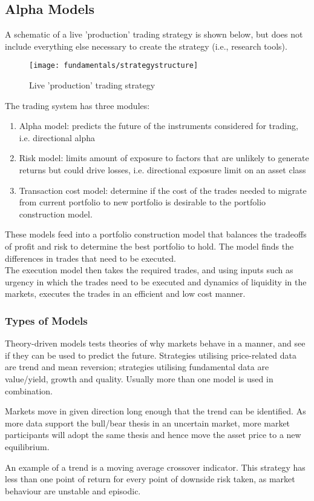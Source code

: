 \subsection{Alpha Models}

A schematic of a live 'production' trading strategy is shown below, but does not include everything else necessary to create the strategy (i.e., research tools).
\begin{figure}[H]
\centering
\texttt{[image: fundamentals/strategystructure]}
\caption{Live 'production' trading strategy}
\end{figure}
The trading system has three modules:
\begin{enumerate}[label=\roman*.]
\setlength{\itemsep}{0pt}
\item Alpha model: predicts the future of the instruments considered for trading, i.e. directional alpha
\item Risk model: limits amount of exposure to factors that are unlikely to generate returns but could drive losses, i.e. directional exposure limit on an asset class
\item Transaction cost model: determine if the cost of the trades needed to migrate from current portfolio to new portfolio is desirable to the portfolio construction model.
\end{enumerate}
These models feed into a portfolio construction model that balances the tradeoffs of profit and risk to determine the best portfolio to hold. The model finds the differences in trades that need to be executed.\\
The execution model then takes the required trades, and using inputs such as urgency in which the trades need to be executed and dynamics of liquidity in the markets, executes the trades in an efficient and low cost manner.

\subsubsection{Types of Models}

Theory-driven models tests theories of why markets behave in a manner, and see if they can be used to predict the future. Strategies utilising price-related data are trend and mean reversion; strategies utilising fundamental data are value/yield, growth and quality. Usually more than one model is used in combination.

\begin{definition}
 Markets move in given direction long enough that the trend can be identified. As more data support the bull/bear thesis in an uncertain market, more market participants will adopt the same thesis and hence move the asset price to a new equilibrium.
\end{definition}
An example of a trend is a moving average crossover indicator. This strategy has less than one point of return for every point of downside risk taken, as market behaviour are unstable and episodic.

